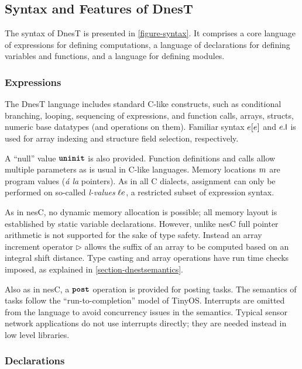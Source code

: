 \subsection{Syntax and Features of DnesT}

The syntax of DnesT is presented in \autoref{figure-syntax}. It comprises a core language of
expressions for defining computations, a language of declarations for defining variables and
functions, and a language for defining modules.

\syntaxfig

\subsubsection{Expressions}

The DnesT language includes standard C-like constructs, such as conditional branching, looping,
sequencing of expressions, and function calls, arrays, structs, numeric base datatypes (and
operations on them). Familiar syntax $e [e]$ and $e.\textsf{l}$ is used for array indexing and
structure field selection, respectively.

A ``null'' value $\mbox{\bf \texttt{uninit}}$ is also provided. Function definitions and calls allow multiple
parameters as is usual in C-like languages. Memory locations $m$ are program values
(\emph{\'a la} pointers). As in all C dialects, assignment can only be performed on so-called
\emph{l-values} $\ell e$, a restricted subset of expression syntax.

As in nesC, no dynamic memory allocation is possible; all memory layout is established by static
variable declarations. However, unlike nesC full pointer arithmetic is not supported for the
sake of type safety. Instead an array increment operator $\rhd$ allows the suffix of an array to
be computed based on an integral shift distance. Type casting and array operations have run time
checks imposed, as explained in \autoref{section-dnestsemantics}.

Also as in nesC, a $\mbox{\bf \texttt{post}}$ operation is provided for posting tasks. The semantics of tasks
follow the ``run-to-completion'' model of TinyOS. Interrupts are omitted from the language to
avoid concurrency issues in the semantics. Typical sensor network applications do not use
interrupts directly; they are needed instead in low level libraries.

\subsubsection{Declarations}

